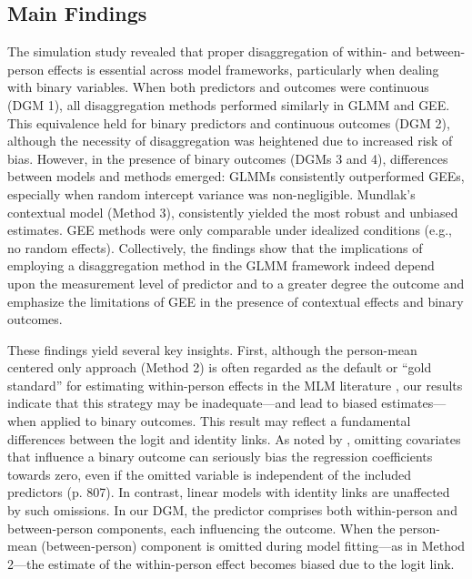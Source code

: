 \subsection{Main Findings}

The simulation study revealed that proper disaggregation of within- and between-person effects is essential across model frameworks, particularly when dealing with binary variables. When both predictors and outcomes were continuous (DGM 1), all disaggregation methods performed similarly in GLMM and GEE. This equivalence held for binary predictors and continuous outcomes (DGM 2), although the necessity of disaggregation was heightened due to increased risk of bias. However, in the presence of binary outcomes (DGMs 3 and 4), differences between models and methods emerged: GLMMs consistently outperformed GEEs, especially when random intercept variance was non-negligible. Mundlak's contextual model (Method 3), consistently yielded the most robust and unbiased estimates. GEE methods were only comparable under idealized conditions (e.g., no random effects). Collectively, the findings show that the implications of employing a disaggregation method in the GLMM framework indeed depend upon the measurement level of predictor and to a greater degree the outcome and emphasize the limitations of GEE in the presence of contextual effects and binary outcomes.

These findings yield several key insights. First, although the person-mean centered only approach (Method 2) is often regarded as the default or “gold standard” for estimating within-person effects in the MLM literature \parencite[e.g.,][]{hamaker_fixed_2020}, our results indicate that this strategy may be inadequate—and lead to biased estimates—when applied to binary outcomes. This result may reflect a fundamental differences between the logit and identity links. As noted by \textcite[]{neuhaus_geometric_1993}, omitting covariates that influence a binary outcome can seriously bias the regression coefficients towards zero, even if the omitted variable is independent of the included predictors (p. 807). In contrast, linear models with identity links are unaffected by such omissions. In our DGM, the predictor comprises both within-person and between-person components, each influencing the outcome. When the person-mean (between-person) component is omitted during model fitting—as in Method 2—the estimate of the within-person effect becomes biased due to the logit link.

